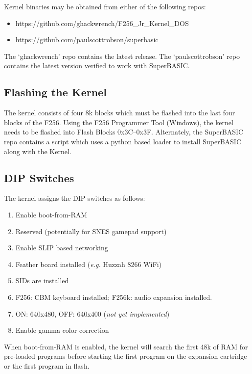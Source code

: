 Kernel binaries may be obtained from either of the following repos: 

\begin{itemize}
    \item  https://github.com/ghackwrench/F256\_Jr\_Kernel\_DOS
    \item  https://github.com/paulscottrobson/superbasic
\end{itemize}

The `ghackwrench' repo contains the latest release.  The `paulscottrobson' repo contains the latest version verified to work with SuperBASIC.

\subsection*{Flashing the Kernel}

The kernel consists of four 8k blocks which must be flashed into the last four blocks of the F256.  Using the F256 Programmer Tool (Windows), the kernel needs to be flashed into Flash Blocks 0x3C--0x3F.  Alternately, the SuperBASIC repo contains a script which uses a python based loader to install SuperBASIC along with the Kernel.

\subsection*{DIP Switches}

The kernel assigns the DIP switches as follows:

\begin{enumerate}
\item Enable boot-from-RAM
\item Reserved (potentially for SNES gamepad support)
\item Enable SLIP based networking
\item Feather board installed ({\it e.g.} Huzzah 8266 WiFi)
\item SIDs are installed
\item F256: CBM keyboard installed; F256k: audio expansion installed.
\item ON: 640x480, OFF: 640x400 ({\em not yet implemented})
\item Enable gamma color correction
\end{enumerate}

When boot-from-RAM is enabled, the kernel will search the first 48k of RAM for pre-loaded programs before starting the first program on the expansion cartridge or the first program in flash.

